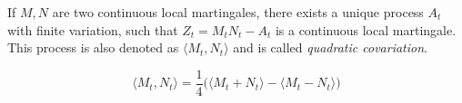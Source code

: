 \begin{corollary}
    If $M,N$ are two continuous local martingales, there exists a unique process $A_t$ with finite variation, such that $Z_t = M_t N_t - A_t$ is a continuous local martingale. This process is also denoted as $\langle M_t, N_t \rangle$ and is called \textit{quadratic covariation}. 

    \begin{equation}
        \langle M_t, N_t \rangle = \frac{1}{4}\Big( \langle M_t + N_t \rangle - \langle M_t - N_t \rangle \Big)
    \end{equation}
\end{corollary}

